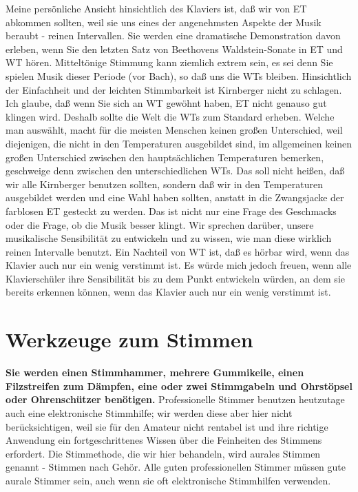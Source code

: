 Meine persönliche Ansicht hinsichtlich des Klaviers ist, daß wir von ET abkommen sollten, weil sie uns eines der angenehmsten Aspekte der Musik beraubt - reinen Intervallen.
 Sie werden eine dramatische Demonstration davon erleben, wenn Sie den letzten Satz von Beethovens Waldstein-Sonate in ET und WT hören.
 Mitteltönige Stimmung kann ziemlich extrem sein, es sei denn Sie spielen Musik dieser Periode (vor Bach), so daß uns die WTs bleiben.
 Hinsichtlich der Einfachheit und der leichten Stimmbarkeit ist Kirnberger nicht zu schlagen.
 Ich glaube, daß wenn Sie sich an WT gewöhnt haben, ET nicht genauso gut klingen wird.
 Deshalb sollte die Welt die WTs zum Standard erheben.
 Welche man auswählt, macht für die meisten Menschen keinen großen Unterschied, weil diejenigen, die nicht in den Temperaturen ausgebildet sind, im allgemeinen keinen großen Unterschied zwischen den hauptsächlichen Temperaturen bemerken, geschweige denn zwischen den unterschiedlichen WTs.
 Das soll nicht heißen, daß wir alle Kirnberger benutzen sollten, sondern daß wir in den Temperaturen ausgebildet werden und eine Wahl haben sollten, anstatt in die Zwangsjacke der farblosen ET gesteckt zu werden.
 Das ist nicht nur eine Frage des Geschmacks oder die Frage, ob die Musik besser klingt.
 Wir sprechen darüber, unsere musikalische Sensibilität zu entwickeln und zu wissen, wie man diese wirklich reinen Intervalle benutzt.
 Ein Nachteil von WT ist, daß es hörbar wird, wenn das Klavier auch nur ein wenig verstimmt ist.
 Es würde mich jedoch freuen, wenn alle Klavierschüler ihre Sensibilität bis zu dem Punkt entwickeln würden, an dem sie bereits erkennen können, wenn das Klavier auch nur ein wenig verstimmt ist.
 
\hypertarget{c2_3}{}

\section{Werkzeuge zum Stimmen}

\textbf{Sie werden einen Stimmhammer, mehrere Gummikeile, einen Filzstreifen zum Dämpfen, eine oder zwei Stimmgabeln und Ohrstöpsel oder Ohrenschützer benötigen.}
 Professionelle Stimmer benutzen heutzutage auch eine elektronische Stimmhilfe; wir werden diese aber hier nicht berücksichtigen, weil sie für den Amateur nicht rentabel ist und ihre richtige Anwendung ein fortgeschrittenes Wissen über die Feinheiten des Stimmens erfordert.
 Die Stimmethode, die wir hier behandeln, wird aurales Stimmen genannt - Stimmen nach Gehör.
 Alle guten professionellen Stimmer müssen gute aurale Stimmer sein, auch wenn sie oft elektronische Stimmhilfen verwenden.
 

